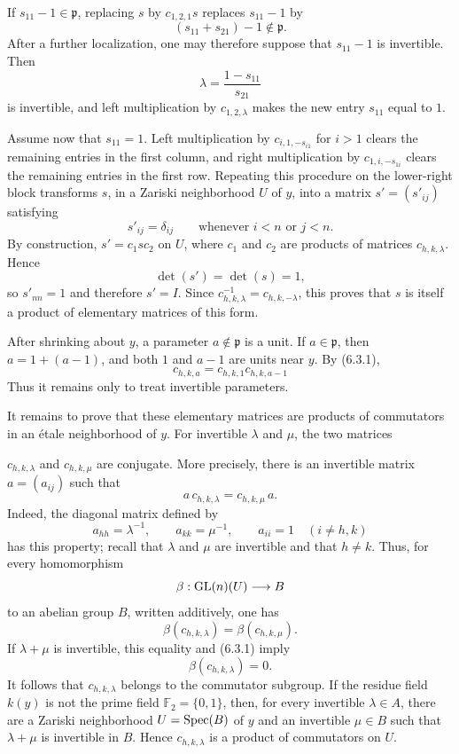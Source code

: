 If $s_{11}-1\in\mathfrak p$, replacing $s$ by $c_{1,2,1}s$ replaces
$s_{11}-1$ by
\[
(s_{11}+s_{21})-1\notin\mathfrak p.
\]
After a further localization, one may therefore suppose that $s_{11}-1$ is
invertible. Then
\[
\lambda=\frac{1-s_{11}}{s_{21}}
\]
is invertible, and left multiplication by $c_{1,2,\lambda}$ makes the new
entry $s_{11}$ equal to $1$.

Assume now that $s_{11}=1$. Left multiplication by
$c_{i,1,-s_{i1}}$ for $i>1$ clears the remaining entries in the first
column, and right multiplication by $c_{1,i,-s_{1i}}$ clears the remaining
entries in the first row. Repeating this procedure on the lower-right block
transforms $s$, in a Zariski neighborhood $U$ of $y$, into a matrix
$s'=(s'_{ij})$ satisfying
\[
s'_{ij}=\delta_{ij}\qquad\text{whenever }i<n\text{ or }j<n.
\]
By construction, $s'=c_1sc_2$ on $U$, where $c_1$ and $c_2$ are products
of matrices $c_{h,k,\lambda}$. Hence
\[
\det(s')=\det(s)=1,
\]
so $s'_{nn}=1$ and therefore $s'=I$. Since
$c_{h,k,\lambda}^{-1}=c_{h,k,-\lambda}$, this proves that $s$ is itself a
product of elementary matrices of this form.

After shrinking about $y$, a parameter $a\notin\mathfrak p$ is a unit. If
$a\in\mathfrak p$, then $a=1+(a-1)$, and both $1$ and $a-1$ are units near
$y$. By (6.3.1),
\[
c_{h,k,a}=c_{h,k,1}c_{h,k,a-1}
\]
Thus it remains only to treat invertible parameters.

It remains to prove that these elementary matrices are products of
commutators in an \'etale neighborhood of $y$. For invertible $\lambda$ and
$\mu$, the two matrices

$c_{h,k,\lambda}$ and $c_{h,k,\mu}$ are conjugate. More precisely, there is
an invertible matrix $a=(a_{ij})$ such that
\[
a\,c_{h,k,\lambda}=c_{h,k,\mu}\,a.
\]
Indeed, the diagonal matrix defined by
\[
a_{hh}=\lambda^{-1},\qquad a_{kk}=\mu^{-1},\qquad
a_{ii}=1\quad(i\ne h,k)
\]
has this property; recall that $\lambda$ and $\mu$ are invertible and that
$h\ne k$. Thus, for every homomorphism
\[
\beta:\operatorname{GL}(n)(U)\longrightarrow B
\]
to an abelian group $B$, written additively, one has
\[
\beta(c_{h,k,\lambda})=\beta(c_{h,k,\mu}).
\]
If $\lambda+\mu$ is invertible, this equality and (6.3.1) imply
\[
\beta(c_{h,k,\lambda})=0.
\]
It follows that $c_{h,k,\lambda}$ belongs to the commutator subgroup. If the
residue field $k(y)$ is not the prime field $\mathbb F_2=\{0,1\}$, then,
for every invertible $\lambda\in A$, there are a Zariski neighborhood
$U=\operatorname{Spec}(B)$ of $y$ and an invertible $\mu\in B$ such that
$\lambda+\mu$ is invertible in $B$. Hence $c_{h,k,\lambda}$ is a product
of commutators on $U$.


